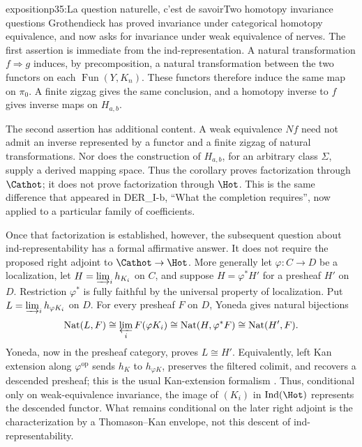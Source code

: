 \begin{dcomment}{exposition}{p35:La question naturelle, c'est de savoir}{Two homotopy invariance questions}
Grothendieck has proved invariance under categorical homotopy equivalence, and now asks for invariance under weak equivalence of nerves. The first assertion is immediate from the ind-representation. A natural transformation $f\Rightarrow g$ induces, by precomposition, a natural transformation between the two functors on each $\operatorname{Fun}(Y,K_n)$. These functors therefore induce the same map on $\pi_0$. A finite zigzag gives the same conclusion, and a homotopy inverse to $f$ gives inverse maps on $H_{a,b}$.

The second assertion has additional content. A weak equivalence $Nf$ need not admit an inverse represented by a functor and a finite zigzag of natural transformations. Nor does the construction of $H_{a,b}$, for an arbitrary class $\Sigma$, supply a derived mapping space. Thus the corollary proves factorization through $\Cathot$; it does not prove factorization through $\Hot$. This is the same difference that appeared in DER\_I-b, ``What the completion requires'', now applied to a particular family of coefficients.

Once that factorization is established, however, the subsequent question about ind-representability has a formal affirmative answer. It does not require the proposed right adjoint to $\Cathot\to\Hot$. More generally let $\varphi:C\to D$ be a localization, let $H=\varinjlim_i h_{K_i}$ on $C$, and suppose $H=\varphi^*H'$ for a presheaf $H'$ on $D$. Restriction $\varphi^*$ is fully faithful by the universal property of localization. Put $L=\varinjlim_i h_{\varphi K_i}$ on $D$. For every presheaf $F$ on $D$, Yoneda gives natural bijections
\[
 \operatorname{Nat}(L,F)
 \cong\varprojlim_i F(\varphi K_i)
 \cong\operatorname{Nat}(H,\varphi^*F)
 \cong\operatorname{Nat}(H',F).
\]
Yoneda, now in the presheaf category, proves $L\cong H'$. Equivalently, left Kan extension along $\varphi^{\mathrm{op}}$ sends $h_K$ to $h_{\varphi K}$, preserves the filtered colimit, and recovers a descended presheaf; this is the usual Kan-extension formalism \citep[\S\S1.1--1.4]{Riehl2014}. Thus, conditional only on weak-equivalence invariance, the image of $(K_i)$ in $\operatorname{Ind}(\Hot)$ represents the descended functor. What remains conditional on the later right adjoint is the characterization by a Thomason--Kan envelope, not this descent of ind-representability.


\end{dcomment}
